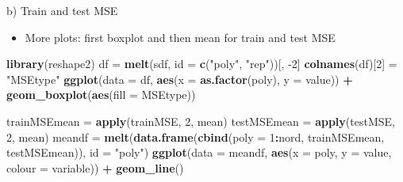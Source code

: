 \documentclass[ignorenonframetext,]{beamer}
\newenvironment{Shaded}{\begin{snugshade}}{\end{snugshade}}
\newcommand{\KeywordTok}[1]{\textcolor[rgb]{0.13,0.29,0.53}{\textbf{#1}}}
\newcommand{\DataTypeTok}[1]{\textcolor[rgb]{0.13,0.29,0.53}{#1}}
\newcommand{\DecValTok}[1]{\textcolor[rgb]{0.00,0.00,0.81}{#1}}
\newcommand{\StringTok}[1]{\textcolor[rgb]{0.31,0.60,0.02}{#1}}
\newcommand{\OperatorTok}[1]{\textcolor[rgb]{0.81,0.36,0.00}{\textbf{#1}}}
\newcommand{\NormalTok}[1]{#1}
\providecommand{\tightlist}{%
  \setlength{\itemsep}{0pt}\setlength{\parskip}{0pt}}
\begin{document}
\begin{frame}[fragile]
\begin{block}{b) Train and test MSE}
\begin{itemize}
\tightlist
\item
  More plots: first boxplot and then mean for train and test MSE
\end{itemize}

\begin{Shaded}
\begin{Highlighting}[]
\KeywordTok{library}\NormalTok{(reshape2)}
\NormalTok{df =}\StringTok{ }\KeywordTok{melt}\NormalTok{(sdf, }\DataTypeTok{id =} \KeywordTok{c}\NormalTok{(}\StringTok{"poly"}\NormalTok{, }\StringTok{"rep"}\NormalTok{))[, }\DecValTok{-2}\NormalTok{]}
\KeywordTok{colnames}\NormalTok{(df)[}\DecValTok{2}\NormalTok{] =}\StringTok{ "MSEtype"}
\KeywordTok{ggplot}\NormalTok{(}\DataTypeTok{data =}\NormalTok{ df, }\KeywordTok{aes}\NormalTok{(}\DataTypeTok{x =} \KeywordTok{as.factor}\NormalTok{(poly), }\DataTypeTok{y =}\NormalTok{ value)) }\OperatorTok{+}\StringTok{ }\KeywordTok{geom_boxplot}\NormalTok{(}\KeywordTok{aes}\NormalTok{(}\DataTypeTok{fill =}\NormalTok{ MSEtype))}
\end{Highlighting}
\end{Shaded}

\begin{Shaded}
\begin{Highlighting}[]
\NormalTok{trainMSEmean =}\StringTok{ }\KeywordTok{apply}\NormalTok{(trainMSE, }\DecValTok{2}\NormalTok{, mean)}
\NormalTok{testMSEmean =}\StringTok{ }\KeywordTok{apply}\NormalTok{(testMSE, }\DecValTok{2}\NormalTok{, mean)}
\NormalTok{meandf =}\StringTok{ }\KeywordTok{melt}\NormalTok{(}\KeywordTok{data.frame}\NormalTok{(}\KeywordTok{cbind}\NormalTok{(}\DataTypeTok{poly =} \DecValTok{1}\OperatorTok{:}\NormalTok{nord, trainMSEmean, testMSEmean)), }
    \DataTypeTok{id =} \StringTok{"poly"}\NormalTok{)}
\KeywordTok{ggplot}\NormalTok{(}\DataTypeTok{data =}\NormalTok{ meandf, }\KeywordTok{aes}\NormalTok{(}\DataTypeTok{x =}\NormalTok{ poly, }\DataTypeTok{y =}\NormalTok{ value, }\DataTypeTok{colour =}\NormalTok{ variable)) }\OperatorTok{+}\StringTok{ }
\StringTok{    }\KeywordTok{geom_line}\NormalTok{()}
\end{Highlighting}
\end{Shaded}

\end{block}

\end{frame}
\end{document}
